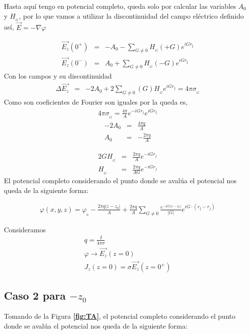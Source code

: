 \documentclass[a4paper,11pt,]{book}
\begin{document}
Hasta aquí tengo en potencial completo, queda solo por calcular las variables $A_0$ y $ H_{_G} $, por lo que vamos a utilizar la discontinuidad del campo eléctrico definido así, $ \vec{E}= -\nabla \varphi $

\begin{eqnarray}
\vec{E_{z}}(0^+) &=& -A_0  - \displaystyle\sum_{G\neq 0} H_{_G}(+G)  e^{i G r_{\Vert}}\\
\vec{E_{z}}(0^-) &=& A_0  + \displaystyle\sum_{G\neq 0} H_{_G}(-G)  e^{i G r_{\Vert}}
\end{eqnarray}
Con los campos y su discontinuidad 
\begin{eqnarray}
\Delta \vec{E_{z}} &=& -2A_0  + 2 \displaystyle\sum_{G\neq 0} (G) H_{_G}  e^{i G r_{\Vert}}=4\pi \sigma_{_{G}}
\end{eqnarray}
Como son coeficientes de Fourier son iguales por la queda es,
\begin{eqnarray}
4\pi \sigma_{_{G}}=\frac{4\pi}{A} e^{-i G r_{j}}e^{i G r_{\Vert}}
\end{eqnarray}
\begin{eqnarray}
\nonumber -2A_0&=&\frac{4\pi q}{A} \\
A_0&=& -\frac{2\pi q}{A}
\end{eqnarray}

\begin{eqnarray}
\nonumber 2GH_{_G}&=&\frac{2\pi q}{A}e^{-i G r_{j}} \\
H_{_G} &=&\frac{2\pi q}{AG}e^{-i G r_{j}}
\end{eqnarray}
El potencial completo considerando el punto donde se avalúa el potencial nos queda de la siguiente forma:

\begin{eqnarray}
\varphi(x,y,z)= \varphi_{_{0}} -\frac{2\pi q\vert z-z_0 \vert}{A}  + \frac{2\pi q}{A}\displaystyle\sum_{G\neq 0}  \frac{ e^{-\vert G \vert \vert z-z_0 \vert} }{\vert G \vert} e^{i G \cdot(r_{\Vert}-r_{j})}
\end{eqnarray}

Consideramos 
\begin{eqnarray}
q = \frac{I}{4\pi \sigma}\\
\varphi\rightarrow \vec{E_z}(z=0)\\
J_z(z=0)=\sigma \vec{E_z}(z=0^+)
\end{eqnarray}
\subsection{Caso 2 para $-z_0$}
Tomando de la Figura \textbf{\ref{fig:TA}}, el potencial completo considerando el punto donde se avalúa el potencial nos queda de la siguiente forma:
\end{document}
